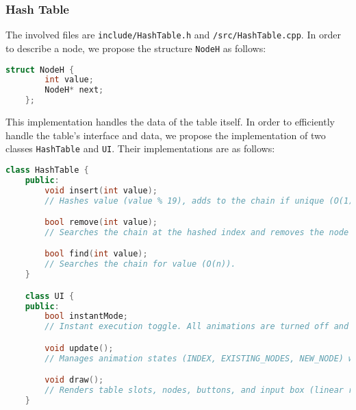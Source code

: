 \documentclass{article}
\begin{document}
\subsubsection{Hash Table}
The involved files are \lstinline|include/HashTable.h| and \lstinline|/src/HashTable.cpp|. In order to describe a node, we propose the structure \lstinline|NodeH| as follows:
\begin{lstlisting}[language=c++]
	struct NodeH {
		int value;
		NodeH* next;
	};
\end{lstlisting}
This implementation handles the data of the table itself. In order to efficiently handle the table's interface and data, we propose the implementation of two classes \lstinline|HashTable| and \lstinline|UI|. Their implementations are as follows:
\begin{lstlisting}[language=c++]
	class HashTable {
	public:
		void insert(int value);
		// Hashes value (value % 19), adds to the chain if unique (O(1) on average, worst case O(n)).

		bool remove(int value);
		// Searches the chain at the hashed index and removes the node (O(n)).

		bool find(int value);
		// Searches the chain for value (O(n)).
	}

	class UI {
	public:
		bool instantMode;
		// Instant execution toggle. All animations are turned off and nodes are immediately present at their positions.

		void update();
		// Manages animation states (INDEX, EXISTING_NODES, NEW_NODE) with a timer, processes user input, and queues file-loaded values.

		void draw();
		// Renders table slots, nodes, buttons, and input box (linear rendering O(n)).
	}
\end{lstlisting}
\end{document}
